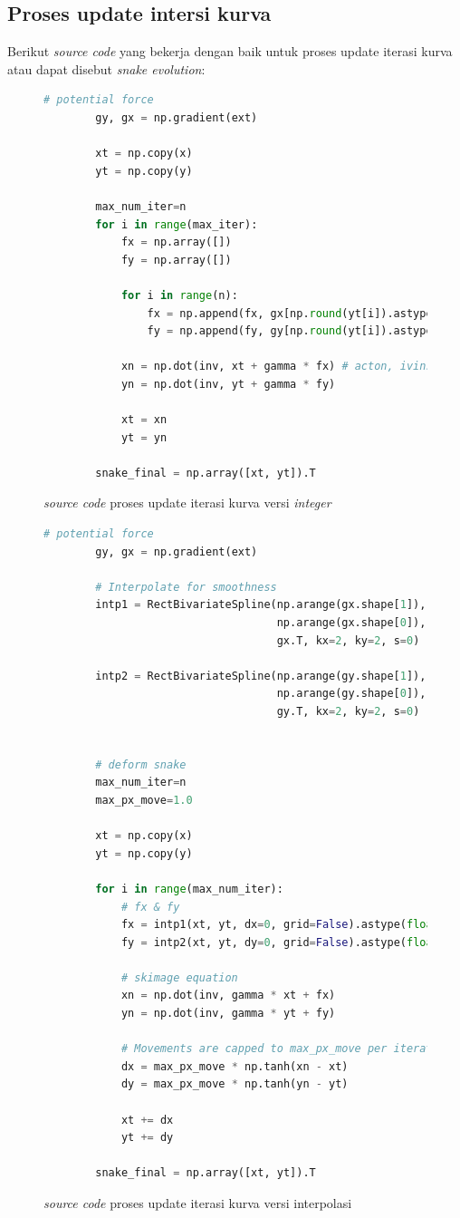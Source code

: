\subsection{Proses update intersi kurva}
Berikut \emph{source code} yang bekerja dengan baik untuk proses update iterasi kurva atau dapat disebut \emph{snake evolution}:
\begin{figure}[H]
	\begin{lstlisting}[language=Python, basicstyle=\tiny]
		# potential force
		gy, gx = np.gradient(ext)
		
		xt = np.copy(x)
		yt = np.copy(y)
		
		max_num_iter=n
		for i in range(max_iter):
			fx = np.array([])
			fy = np.array([])
			
			for i in range(n):
				fx = np.append(fx, gx[np.round(yt[i]).astype(int)] [np.round(xt[i]).astype(int)] )
				fy = np.append(fy, gy[np.round(yt[i]).astype(int)] [np.round(xt[i]).astype(int)] )
			
			xn = np.dot(inv, xt + gamma * fx) # acton, ivins equation
			yn = np.dot(inv, yt + gamma * fy)
			
			xt = xn
			yt = yn
		
		snake_final = np.array([xt, yt]).T
	\end{lstlisting}
	\caption{\emph{source code} proses update iterasi kurva versi \emph{integer}}
	\label{code:snake_evol_int}
\end{figure}
\begin{figure}[H]
	\begin{lstlisting}[language=Python, basicstyle=\tiny]
		# potential force
		gy, gx = np.gradient(ext)
		
		# Interpolate for smoothness
		intp1 = RectBivariateSpline(np.arange(gx.shape[1]),
									np.arange(gx.shape[0]),
									gx.T, kx=2, ky=2, s=0)
		
		intp2 = RectBivariateSpline(np.arange(gy.shape[1]),
									np.arange(gy.shape[0]),
									gy.T, kx=2, ky=2, s=0)
		
		
		# deform snake
		max_num_iter=n
		max_px_move=1.0
		
		xt = np.copy(x)
		yt = np.copy(y)
		
		for i in range(max_num_iter):
			# fx & fy
			fx = intp1(xt, yt, dx=0, grid=False).astype(float, copy=False)
			fy = intp2(xt, yt, dy=0, grid=False).astype(float, copy=False)
		
			# skimage equation
			xn = np.dot(inv, gamma * xt + fx)
			yn = np.dot(inv, gamma * yt + fy)
		
			# Movements are capped to max_px_move per iteration. skimage
			dx = max_px_move * np.tanh(xn - xt)
			dy = max_px_move * np.tanh(yn - yt)
		
			xt += dx
			yt += dy
		
		snake_final = np.array([xt, yt]).T
	\end{lstlisting}
	\caption{\emph{source code} proses update iterasi kurva versi interpolasi}
	\label{code:snake_evol_float}
\end{figure}
